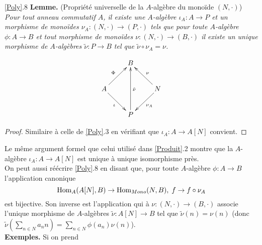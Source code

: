 \documentclass[a4paper, oneside, 12pt]{book}
\theoremstyle{definition} %
\begin{document}
 \ref{Poly}.8 \textbf{Lemme.} (Propriété universelle de la $A$-algèbre du monoïde $(N,\cdot)$) \textit{Pour tout anneau commutatif $A$, il existe une $A$-algèbre $\iota_A: A\rightarrow P$ et un  morphisme de monoïdes $\nu_A:(N,\cdot)\rightarrow (P  ,\cdot)$ tels que pour toute $A$-algèbre   $\phi: A\rightarrow B$ et tout morphisme de monoïdes $\nu:(N,\cdot)\rightarrow (B  ,\cdot)$  il existe un unique  morphisme de $A$-algèbres $\tilde{\nu}:P\rightarrow B$  tel que $ \tilde{\nu}\circ \nu_A=\nu$. }

	$$ \xymatrix{ & B \\ A \ar[ru]^\Phi \ar[rd]_\iota & & N \ar[lu]_\nu \ar[ld]^{\nu_A} \\ & P \ar[uu]_{\tilde{\nu} } } $$

\begin{proof} Similaire à celle de \ref{Poly}.3 en vérifiant que $\iota_A:A\rightarrow A[N]$ convient. \end{proof}

  Le même argument  formel que celui utilisé dans \ref{Produit}.2 montre que la $A$-algèbre $\iota_A: A\rightarrow A[N]$ est unique à unique isomorphisme  près.\\
 
  On peut aussi réécrire \ref{Poly}.8 en disant que, pour toute $A$-algèbre $\phi:A\rightarrow B$  l'application canonique
$$\hbox{\rm Hom}_A(A[N],B)\rightarrow\hbox{\rm Hom}_{Mono}(N,B),\; f\rightarrow f\circ\nu_A$$
 est bijective. Son inverse est l'application qui à $\nu:(N,\cdot)\rightarrow (B,\cdot) $ associe l'unique morphisme de $A$-algèbres $ \tilde{\nu}:A[N]\rightarrow B$ tel que $ \tilde{\nu}(n)=\nu(n)$ (donc $\tilde{\nu}(\sum_{n\in N}a_nn)=\sum_{n\in N}\phi(a_n)\nu(n)$).\\
 
  \textbf{Exemples.} Si on prend\\
  
\end{document}
